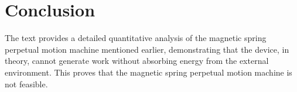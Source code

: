 \documentclass[12pt]{article}
\begin{document}
\section{Conclusion}
\label{sec:con}
The text provides a detailed quantitative analysis of the magnetic spring perpetual motion machine mentioned earlier, demonstrating that the device, in theory, cannot generate work without absorbing energy from the external environment. This proves that the magnetic spring perpetual motion machine is not feasible.
\end{document}
